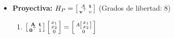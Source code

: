 \documentclass[12pt,a4paper]{article}
\begin{document}
\begin{itemize}
\begin{enumerate}
		\item $
		H_{A}^{-1} =
		\left[ {\begin{smallmatrix}
		 A^{-1} & -A^{-1}{\bf t}\\
		 {\bf 0}^{\top} & 1 \\
		\end{smallmatrix} } \right]
		$

		\item $l_{\infty} = \left[ {\begin{smallmatrix}
		 0\\
		 0\\
		 1\\
		\end{smallmatrix} } \right]$

		\item $l_{\infty} = H_{A} l_{\infty}$

		\item $x \in l \Rightarrow H_{A}(x) \in H_{A}(l)$

		\item $l_{1} // l_{2} \Rightarrow H_{A}(l_{1})//H_{A}(l_{2})$
	\end{enumerate}
	
	{\bf Invariantes:} 
	\begin{itemize}
		\item Paralelismo
		\item Raz\'on de \'areas
		\item Raz\'on de longitudes en lineas paralelas o colineales
		\item $l_{\infty}$
	\end{itemize}

\item {\bf Proyectiva:}
$H_{P} =
\left[ {\begin{smallmatrix}
 A & {\bf t}\\
 {\bf v}^{\top} & v \\
\end{smallmatrix} } \right]
$ \hspace*{1cm}(Grados de libertad: 8)

	\begin{enumerate}
		\item $\left[ {\begin{smallmatrix}
		 {\bf A} & {\bf t}\\
		 {\bf 0}^{\top} & 1 \\
		\end{smallmatrix} } \right] \left[ {\begin{smallmatrix}
		 x_{1}\\
		 x_{2}\\
		 0\\
		\end{smallmatrix} } \right] = \left[ {\begin{smallmatrix}
		 A\left[ {\begin{smallmatrix}
		  x_{1}\\
		   x_{2}\\
		 \end{smallmatrix} } \right]\\
		 0\\
		\end{smallmatrix} } \right]
		$


\end{enumerate}
\end{itemize}
\end{document}
